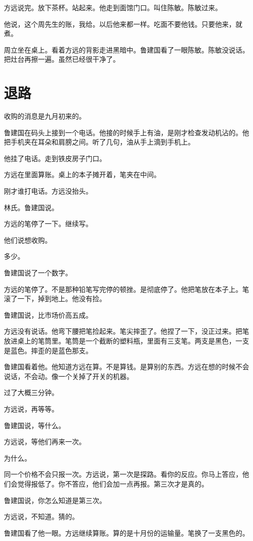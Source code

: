 \documentclass[UTF8,a5paper,11pt,openany]{ctexbook}
\begin{document}
方远说完。放下茶杯。站起来。他走到面馆门口。叫住陈敏。陈敏过来。

他说，这个周先生的账，我给。以后他来都一样。吃面不要他钱。只要他来，就煮。

周立坐在桌上。看着方远的背影走进黑暗中。鲁建国看了一眼陈敏。陈敏没说话。把灶台再擦一遍。虽然已经很干净了。

\clearpage

\chapter{退路}
\indent
收购的消息是九月初来的。

鲁建国在码头上接到一个电话。他接的时候手上有油，是刚才检查发动机沾的。他把手机夹在耳朵和肩膀之间。听了几句，油从手上滴到手机上。

他挂了电话。走到铁皮房子门口。

方远在里面算账。桌上的本子摊开着，笔夹在中间。

刚才谁打电话。方远没抬头。

林氏。鲁建国说。

方远的笔停了一下。继续写。

他们说想收购。

多少。

鲁建国说了一个数字。

方远的笔停了。不是那种铅笔写完停的顿挫。是彻底停了。他把笔放在本子上。笔滚了一下，掉到地上。他没有捡。

鲁建国说，比市场价高五成。

方远没有说话。他弯下腰把笔捡起来。笔尖摔歪了。他捏了一下，没正过来。把笔放进桌上的笔筒里。笔筒是一个截断的塑料瓶，里面有三支笔。两支是黑色，一支是蓝色。摔歪的是蓝色那支。

鲁建国看着他。他知道方远在算。不是算钱。是算别的东西。方远在想的时候不会说话，不会动。像一个关掉了开关的机器。

过了大概三分钟。

方远说，再等等。

鲁建国说，等什么。

方远说，等他们再来一次。

为什么。

同一个价格不会只报一次。方远说，第一次是探路。看你的反应。你马上答应，他们会觉得报低了。你不答应，他们会加一点再报。第三次才是真的。

鲁建国说，你怎么知道是第三次。

方远说，不知道。猜的。

鲁建国看了他一眼。方远继续算账。算的是十月份的运输量。笔换了一支黑色的。
\end{document}
